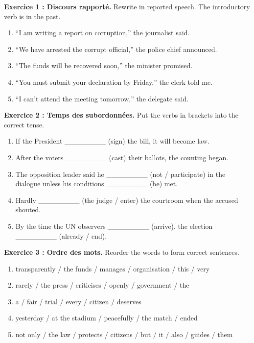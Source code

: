 \documentclass[11pt]{article}
\begin{document}
\begin{exercice}
\textbf{Exercice 1 : Discours rapporté.} Rewrite in reported speech. The introductory verb is in the past.
\begin{enumerate}
\item “I am writing a report on corruption,” the journalist said.
\item “We have arrested the corrupt official,” the police chief announced.
\item “The funds will be recovered soon,” the minister promised.
\item “You must submit your declaration by Friday,” the clerk told me.
\item “I can’t attend the meeting tomorrow,” the delegate said.
\end{enumerate}

\textbf{Exercice 2 : Temps des subordonnées.} Put the verbs in brackets into the correct tense.
\begin{enumerate}
\item If the President \_\_\_\_\_\_\_\_ (sign) the bill, it will become law.
\item After the voters \_\_\_\_\_\_\_\_ (cast) their ballots, the counting began.
\item The opposition leader said he \_\_\_\_\_\_\_\_ (not / participate) in the dialogue unless his conditions \_\_\_\_\_\_\_\_ (be) met.
\item Hardly \_\_\_\_\_\_\_\_ (the judge / enter) the courtroom when the accused shouted.
\item By the time the UN observers \_\_\_\_\_\_\_\_ (arrive), the election \_\_\_\_\_\_\_\_ (already / end).
\end{enumerate}

\textbf{Exercice 3 : Ordre des mots.} Reorder the words to form correct sentences.
\begin{enumerate}
\item transparently / the funds / manages / organisation / this / very
\item rarely / the press / criticises / openly / government / the
\item a / fair / trial / every / citizen / deserves
\item yesterday / at the stadium / peacefully / the match / ended
\item not only / the law / protects / citizens / but / it / also / guides / them
\end{enumerate}


\end{exercice}
\end{document}
